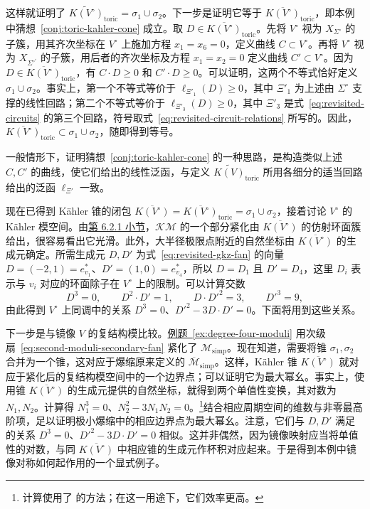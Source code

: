 \begin{example}[重访]
这样就证明了 $\widetilde{K(V^\circ)}_{\mathrm{toric}}=\sigma_1\cup\sigma_2$。下一步是证明它等于 $\overline{K(V^\circ)}_{\mathrm{toric}}$，即本例中猜想~\ref{conj:toric-kahler-cone} 成立。取 $D\in\overline{K(V^\circ)}_{\mathrm{toric}}$。先将 $V^\circ$ 视为 $X_{\Sigma^\circ}$ 的子簇，用其齐次坐标在 $V^\circ$ 上施加方程 $x_1=x_6=0$，定义曲线 $C\subset V^\circ$。再将 $V^\circ$ 视为 $X_{\Sigma^{\circ\prime}}$ 的子簇，用后者的齐次坐标及方程 $x_1=x_2=0$ 定义曲线 $C'\subset V^\circ$。因为 $D\in\overline{K(V^\circ)}_{\mathrm{toric}}$，有 $C\cdot D\geq0$ 和 $C'\cdot D\geq0$。可以证明，这两个不等式恰好定义 $\sigma_1\cup\sigma_2$。事实上，第一个不等式等价于 $\ell_{\Xi'_1}(D)\geq0$，其中 $\Xi'_1$ 为上述由 $\Sigma^\circ$ 支撑的线性回路；第二个不等式等价于 $\ell_{\Xi'_3}(D)\geq0$，其中 $\Xi'_3$ 是式~\eqref{eq:revisited-circuits} 的第三个回路，符号取式~\eqref{eq:revisited-circuit-relations} 所写的。因此，$\overline{K(V^\circ)}_{\mathrm{toric}}\subset\sigma_1\cup\sigma_2$，随即得到等号。

一般情形下，证明猜想~\ref{conj:toric-kahler-cone} 的一种思路，是构造类似上述 $C,C'$ 的曲线，使它们给出的线性泛函，与定义 $\widetilde{K(V)}_{\mathrm{toric}}$ 所用各细分的适当回路给出的泛函 $\ell_{\Xi'}$ 一致。

现在已得到 Kähler 锥的闭包
$\overline{K(V^\circ)}=\overline{K(V^\circ)}_{\mathrm{toric}}=\sigma_1\cup\sigma_2$，接着讨论 $V^\circ$ 的 Kähler 模空间。由\hyperref[subsec:large-radius-limits]{第 6.2.1 小节}，$\mathcal{KM}$ 的一个部分紧化由 $\overline{K(V^\circ)}$ 的仿射环面簇给出，很容易看出它光滑。此外，大半径极限点附近的自然坐标由 $\overline{K(V^\circ)}$ 的生成元确定。所需生成元 $D,D'$ 为式~\eqref{eq:revisited-gkz-fan} 的向量 $D=(-2,1)=e_{v_1}^*$、$D'=(1,0)=e_{v_4}^*$，所以 $D=D_1$ 且
$D'=D_4$，这里 $D_i$ 表示与 $v_i$ 对应的环面除子在 $V^\circ$ 上的限制。可以计算交数
\[
D^3=0,\qquad D^2\cdot D'=1,\qquad D\cdot D'^2=3,\qquad D'^3=9,
\]
由此得到 $V^\circ$ 上同调中的关系 $D^3=0$、$D'^2-3D\cdot D'=0$。下面将用到这些关系。

下一步是与镜像 $V$ 的复结构模比较。\hyperref[ex:degree-four-moduli]{例题~\ref*{ex:degree-four-moduli}} 用次级扇~\eqref{eq:second-moduli-secondary-fan} 紧化了 $\mathcal M_{\mathrm{simp}}$。现在知道，需要将锥 $\sigma_1,\sigma_2$ 合并为一个锥，这对应于爆缩原来定义的 $\overline{\mathcal M}_{\mathrm{simp}}$。这样，Kähler 锥 $\overline{K(V^\circ)}$ 就对应于紧化后的复结构模空间中的一个边界点；可以证明它为最大幂幺。事实上，使用锥 $\overline{K(V^\circ)}$ 的生成元提供的自然坐标，就得到两个单值性变换，其对数为 $N_1,N_2$。计算得 $N_1^3=0$、$N_2^2-3N_1N_2=0$。\footnote{计算使用了  的方法；在这一用途下，它们效率更高。}结合相应周期空间的维数与非零最高阶项，足以证明极小爆缩中的相应边界点为最大幂幺。注意，它们与 $D,D'$ 满足的关系 $D^3=0$、$D'^2-3D\cdot D'=0$ 相似。这并非偶然，因为镜像映射应当将单值性的对数，与同 $\overline{K(V^\circ)}$ 中相应锥的生成元作杯积对应起来。于是得到本例中镜像对称如何起作用的一个显式例子。
\end{example}
\endgroup

